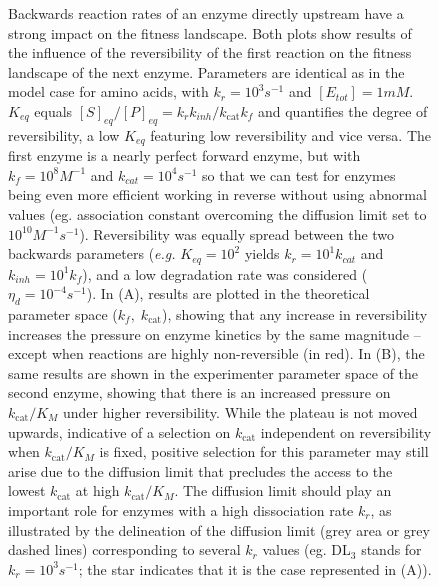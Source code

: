 \begin{figure}[h!]
\begin{minipage}[c]{0.49\linewidth}
\end{minipage}
\caption{Backwards reaction rates of an enzyme directly upstream have a strong impact on the fitness landscape. Both plots show results of the influence of the reversibility of the first reaction on the fitness landscape of the next enzyme. Parameters are identical as in the model case for amino acids, with $k_r=10^3s^{-1}$ and $[E_{tot}]=1mM$. $K_{eq}$ equals $[S]_{eq}/[P]_{eq}=k_rk_{inh}/k_\text{cat}k_f$ \citep{Klipp94} and quantifies the degree of reversibility, a low $K_{eq}$ featuring low reversibility and vice versa. The first enzyme is a nearly perfect forward enzyme, but with $k_f=10^{8}M^{-1}$ and $k_{cat}=10^4s^{-1}$ so that we can test for enzymes being even more efficient working in reverse without using abnormal values (eg. association constant overcoming the diffusion limit set to $10^{10}M^{-1}s^{-1}$). 
Reversibility was equally spread between the two backwards parameters (\textit{e.g.} $K_{eq}=10^2$ yields $k_r=10^{1}k_{cat}$ and $k_{inh}=10^{1}k_f$), and a low degradation rate was considered ($\eta_d=10^{-4}s^{-1}$). In (A), results are plotted in the theoretical parameter space ($k_f, \; k_\text{cat}$), showing that any increase in reversibility increases the pressure on enzyme kinetics by the same magnitude -- except when reactions are highly non-reversible (in red). In (B), the same results are shown in the experimenter parameter space of the second enzyme, showing that there is an increased pressure on $k_\text{cat}/K_M$ under higher reversibility. 
While the plateau is not moved upwards, indicative of a selection on $k_\text{cat}$ independent on reversibility when $k_\text{cat}/K_M$ is fixed, positive selection for this parameter may still arise due to the diffusion limit that precludes the access to the lowest $k_\text{cat}$ at high $k_\text{cat}/K_M$. The diffusion limit should play an important role for enzymes with a high dissociation rate $k_r$, as illustrated by the delineation of the diffusion limit (grey area or grey dashed lines) corresponding to several $k_r$ values (eg. DL$_3$ stands for $k_r=10^3s^{-1}$; the star indicates that it is the case represented in (A)).}
\label{figure2D_Reverse}
\end{figure}

